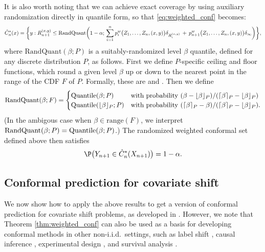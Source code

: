 \documentclass{article}
\begin{document}
It is also worth noting that we can achieve exact coverage by using auxiliary
randomization directly in quantile form, so that \eqref{eq:weighted_conf}
becomes:      
\[
\hat{C}^*_n(x) = \bigg\{ y : R_{n+1}^{(x,y)} \leq \mathrm{RandQuant}\bigg( 1-\alpha;  
\, \sum_{i=1}^n p^w_i\big( Z_1,\dots,Z_n,(x,y) \big) \delta_{R_i^{(x,y)}} \,+\, 
p^w_{n+1}\big( Z_1,\dots,Z_n,(x,y) \big) \delta_\infty \bigg) \bigg\},  
\]
where $\mathrm{RandQuant}(\beta; P)$ is a suitably-randomized level $\beta$ 
quantile, defined for any discrete distribution $P$, as follows. First we
define $P$-specific ceiling and floor functions, which round a given level
$\beta$ up or down to the nearest point in the range of the CDF $F$ of $P$.
Formally, these are  and . Then we define    
\[
\mathrm{RandQuant}(\beta; F) = 
\begin{cases}
\displaystyle
\mathrm{Quantile}(\beta; P) & 
\text{with probability $(\beta - \lfloor \beta \rfloor_P) /
  (\lceil \beta \rceil_P - \lfloor \beta \rfloor_P)$} \\
\mathrm{Quantile}(\lfloor \beta \rfloor_P; P)& 
\text{with probability $(\lceil \beta \rceil_P - \beta) /
  (\lceil \beta \rceil_P - \lfloor \beta \rfloor_P)$}.
\end{cases}
\]
(In the ambigous case when $\beta \in \mathrm{range}(F)$, we interpret
$\mathrm{RandQuant}(\beta; P) = \mathrm{Quantile}(\beta; P)$.) The randomized weighted
conformal set  defined above then satisfies 
\[
\P\big( Y_{n+1} \in \hC^*_n(X_{n+1}) \big) = 1-\alpha.  
\]

\subsection{Conformal prediction for covariate shift}

We now show how to apply the above results to get a version of conformal
prediction for covariate shift problems, as developed in
\citet{tibshirani2019conformal}. However, we note that Theorem 
\ref{thm:weighted_conf} can also be used as a basis for developing conformal
methods in other non-i.i.d.\ settings, such as label shift
\citep{podkopaev2021distribution}, causal inference \citep{lei2021conformal},
experimental design \citep{fannjiang2022conformal}, and survival analysis
\citep{candes2023conformalized}. 
\end{document}
